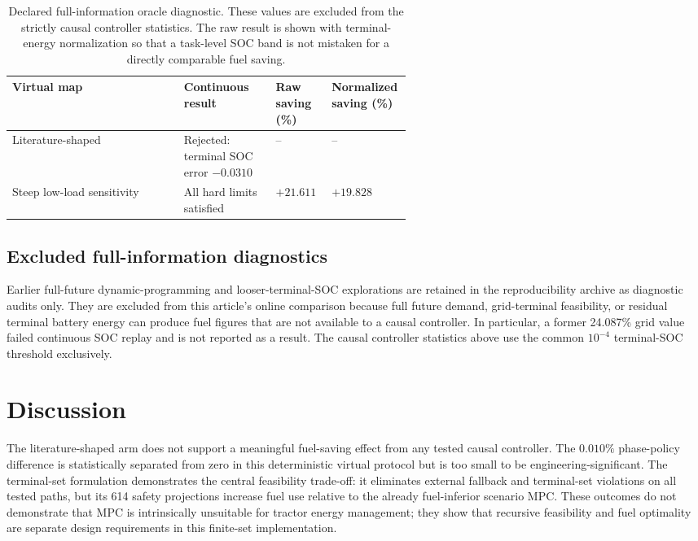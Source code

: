 \documentclass[agriengineering,article,submit,moreauthors]{Definitions/mdpi}
\begin{document}
\begin{table}[H]
\centering
\caption{Declared full-information oracle diagnostic. These values are excluded from the strictly causal controller statistics. The raw result is shown with terminal-energy normalization so that a task-level SOC band is not mistaken for a directly comparable fuel saving.}
\label{tab:oracle}
\scriptsize
\setlength{\tabcolsep}{3pt}
\begin{tabularx}{\linewidth}{@{}X p{0.23\linewidth} p{0.14\linewidth} p{0.20\linewidth}@{}}
\toprule
Virtual map & Continuous result & Raw saving (\%) & Normalized saving (\%) \\
\midrule
Literature-shaped & Rejected: terminal SOC error $-0.0310$ & -- & -- \\
Steep low-load sensitivity & All hard limits satisfied & $+21.611$ & $+19.828$ \\
\bottomrule
\end{tabularx}
\end{table}

\subsection{Excluded full-information diagnostics}
Earlier full-future dynamic-programming and looser-terminal-SOC explorations are retained in the reproducibility archive as diagnostic audits only. They are excluded from this article's online comparison because full future demand, grid-terminal feasibility, or residual terminal battery energy can produce fuel figures that are not available to a causal controller. In particular, a former 24.087\% grid value failed continuous SOC replay and is not reported as a result. The causal controller statistics above use the common $10^{-4}$ terminal-SOC threshold exclusively.

\section{Discussion}
The literature-shaped arm does not support a meaningful fuel-saving effect from any tested causal controller. The $0.010\%$ phase-policy difference is statistically separated from zero in this deterministic virtual protocol but is too small to be engineering-significant. The terminal-set formulation demonstrates the central feasibility trade-off: it eliminates external fallback and terminal-set violations on all tested paths, but its 614 safety projections increase fuel use relative to the already fuel-inferior scenario MPC. These outcomes do not demonstrate that MPC is intrinsically unsuitable for tractor energy management; they show that recursive feasibility and fuel optimality are separate design requirements in this finite-set implementation.
\end{document}

